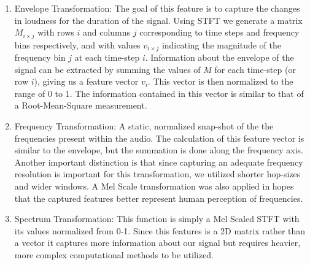 \documentclass{nime-alternate} %
\begin{document}
\begin{enumerate}
\item Envelope Transformation: The goal of this feature is to capture the changes in loudness for the duration of the signal. Using STFT we generate a matrix $M_{i \times j}$ with rows $i$ and columns $j$ corresponding to time steps and frequency bins respectively, and with values $v_{i \times j}$ indicating the magnitude of the frequency bin $j$ at each time-step $i$. Information about the envelope of the signal can be extracted by summing the values of $M$ for each time-step (or row $i$), giving us a feature vector $v_i$. This vector is then normalized to the range of 0 to 1. The information contained in this vector is similar to that of a Root-Mean-Square measurement.
\item Frequency Transformation: A static, normalized snap-shot of the the frequencies present within the audio. The calculation of this feature vector is similar to the envelope, but the summation is done along the frequency axis. Another important distinction is that since capturing an adequate frequency resolution is important for this transformation, we utilized shorter hop-sizes and wider windows. A Mel Scale transformation was also applied in hopes that the captured features better represent human perception of frequencies. 
\item Spectrum Transformation: This function is simply a Mel Scaled STFT with its values normalized from 0-1. Since this features is a 2D matrix rather than a vector it captures more information about our signal but requires heavier, more complex computational methods to be utilized. 
\end{enumerate}   
\end{document}
